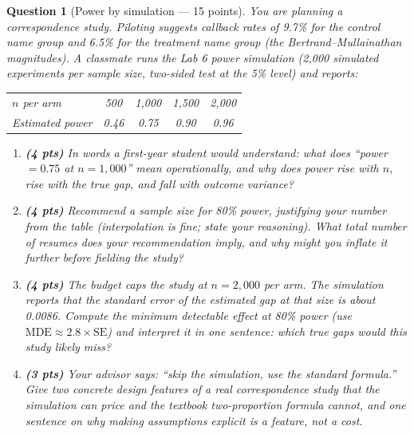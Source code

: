 \documentclass[11pt]{article}
\newtheorem{question}{Question}
\begin{document}
\begin{question}[Power by simulation --- 15 points]
You are planning a correspondence study. Piloting suggests callback rates
of 9.7\% for the control name group and 6.5\% for the treatment name
group (the Bertrand--Mullainathan magnitudes). A classmate runs the Lab 6
power simulation (2{,}000 simulated experiments per sample size,
two-sided test at the 5\% level) and reports:

\begin{center}
\begin{tabular}{@{}lcccc@{}}
\toprule
$n$ per arm & 500 & 1{,}000 & 1{,}500 & 2{,}000 \\
Estimated power & 0.46 & 0.75 & 0.90 & 0.96 \\
\bottomrule
\end{tabular}
\end{center}

\begin{enumerate}[label=(\alph*)]
  \item \textbf{(4 pts)} In words a first-year student would understand:
        what does ``power $= 0.75$ at $n = 1{,}000$'' mean
        operationally, and why does power rise with $n$, rise with the
        true gap, and fall with outcome variance?
  \item \textbf{(4 pts)} Recommend a sample size for 80\% power,
        justifying your number from the table (interpolation is fine;
        state your reasoning). What total number of resumes does your
        recommendation imply, and why might you inflate it further
        before fielding the study?
  \item \textbf{(4 pts)} The budget caps the study at $n = 2{,}000$ per
        arm. The simulation reports that the standard error of the
        estimated gap at that size is about 0.0086. Compute the
        \emph{minimum detectable effect} at 80\% power (use
        $\text{MDE} \approx 2.8 \times \text{SE}$) and interpret it in
        one sentence: which true gaps would this study likely miss?
  \item \textbf{(3 pts)} Your advisor says: ``skip the simulation, use
        the standard formula.'' Give two concrete design features of a
        real correspondence study that the simulation can price and the
        textbook two-proportion formula cannot, and one sentence on why
        making assumptions explicit is a feature, not a cost.
\end{enumerate}
\end{question}
\end{document}
